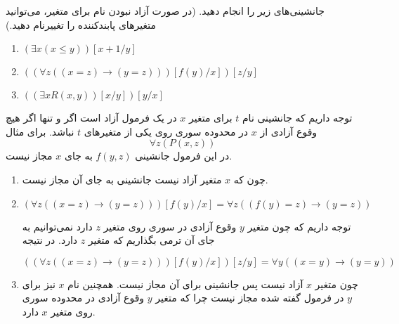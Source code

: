
	جانشینی‌های زیر را انجام دهید. (در صورت آزاد نبودن نام برای متغیر، می‌توانید متغیرهای پابندکننده را تغییرنام دهید.)
	\begin{enumerate}[label=(\alph*)]
		\item $(\exists x (x \leq y))[x+1/y]$
		\item $((\forall z ((x = z) \rightarrow (y = z)))[f(y)/x])[z/y]$
		\item $((\exists x R(x, y))[x/y])[y/x]$
	\end{enumerate}
	\quad\vspace{0.5cm}
	\begin{ans}
		توجه داریم که جانشینی نام $t$ برای متغیر $x$ در یک فرمول آزاد است اگر و تنها اگر هیچ وقوع آزادی از $x$ در محدوده سوری روی یکی از متغیر‌های $t$ نباشد. 
		برای مثال
		$$
			\forall z(P(x, z))
		$$
		در این فرمول جانشینی 
		$
		 	f(y,z)
		$
		به جای $x$ مجاز نیست.\\
		\begin{enumerate}[label=(\alph*)]
			\item 
			چون‌ که $x$ متغیر آزاد نیست جانشینی به جای آن مجاز نیست.
			\item 
			$
				(\forall z ((x = z) \rightarrow (y = z)))[f(y)/x] = \forall z ((f(y) = z) \rightarrow (y = z))
			$

			توجه داریم که چون متغیر $y$ وقوع آزادی در سوری روی متغیر $z$ دارد نمی‌توانیم به جای آن ترمی بگذاریم که متغیر $z$ دارد. در نتیجه

			$
				((\forall z ((x = z) \rightarrow (y = z)))[f(y)/x])[z/y] = 
				\forall y ((x = y) \rightarrow (y = y))
			$
			\item
			چون متغیر $x$ آزاد نیست پس جانشینی برای آن مجاز نیست. همچنین نام $x$ نیز برای $y$ در فرمول گفته شده مجاز نیست چرا که متغیر $y$ وقوع آزادی در محدوده سوری روی متغیر $x$ دارد.
		\end{enumerate}
	\end{ans}

